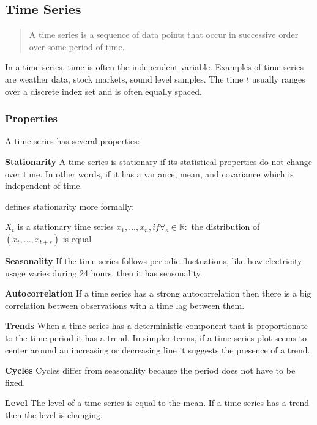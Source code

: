 \subsection{Time Series}
\label{sec:time-series}
\begin{quote}
    A time series is a sequence of data
    points that occur in successive order over some period of time.
\end{quote}
\cite{Hayes}

In a time series, time is often the independent variable.
Examples of time series are weather data, stock markets, sound level samples.
The time $t$ usually ranges over a discrete index set and is often equally spaced.

\subsubsection{Properties}
A time series has several properties:


\textbf{Stationarity}
A time series is stationary if its statistical properties do not change over time.
In other words, if it has a variance, mean, and covariance which is independent of time.

\cite{RobJHyndman2014} defines stationarity more formally:
\begin{definition}
   $X_t$ is a stationary time series 
   $x_1, ..., x_n, if \forall_s \in \mathbb{R} :$
   the distribution of $(x_t, ..., x_{t+s})$ is equal
\end{definition}

\textbf{Seasonality}
If the time series follows periodic fluctuations, like how electricity usage varies during 24 hours,
then it has seasonality.

\textbf{Autocorrelation}
If a time series has a strong autocorrelation then there is a big
correlation between observations with a time lag between them.

\textbf{Trends}
When a time series has a deterministic component that is proportionate to the time period it has a trend.
In simpler terms, if a time series plot seems to center around an increasing or decreasing line it suggests the presence of a trend.

\textbf{Cycles}
Cycles differ from seasonality because the period does not have to be fixed.


\textbf{Level}
The level of a time series is equal to the mean. If a time series has a trend
then the level is changing.


